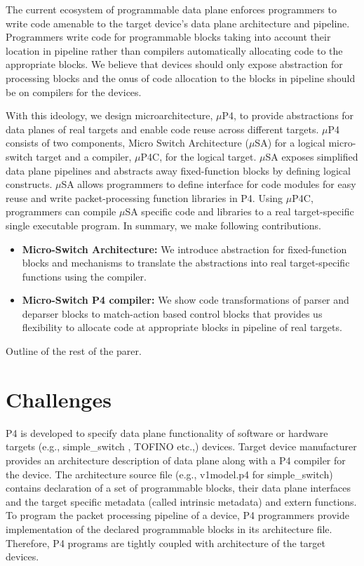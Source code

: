 \documentclass{hotnets19}
\begin{document}
The current ecosystem of programmable data plane enforces programmers to write code amenable to the target device's data plane architecture and pipeline.
Programmers write code for programmable blocks taking into account their location in pipeline rather than compilers automatically allocating code to the appropriate blocks.
We believe that devices should only expose abstraction for processing blocks and the onus of code allocation to the blocks in pipeline should be on compilers for the devices.

With this ideology, we design microarchitecture, $\mu$P4, to provide abstractions for 
data planes of real targets and enable code reuse across different targets.
$\mu$P4 consists of two components, Micro Switch Architecture ($\mu$SA) for a logical micro-switch target and a compiler, $\mu$P4C, for the logical target. 
$\mu$SA exposes simplified data plane pipelines and abstracts away fixed-function blocks by defining logical constructs.
$\mu$SA allows programmers to define interface for code modules for easy reuse and write packet-processing function libraries in P4.
Using $\mu$P4C, programmers can compile $\mu$SA specific code and libraries to a real target-specific single executable program.
In summary, we make following contributions.
\begin{itemize}
\item \textbf{Micro-Switch Architecture:} We introduce abstraction for fixed-function blocks and mechanisms to translate the abstractions into real target-specific functions using the compiler.
\item \textbf{Micro-Switch P4 compiler:} We show code transformations of parser and deparser blocks to match-action based control blocks that provides us flexibility to allocate code at appropriate blocks in pipeline of real targets.
\end{itemize}

Outline of the rest of the parer. 

\section{Challenges}
P4 is developed to specify data plane functionality of software or hardware targets (e.g., simple\_\-switch \cite{simple_switch.md}, TOFINO \cite{tofino} etc.,) devices.
Target device manufacturer provides an architecture description of data plane along with a P4 compiler for the device.
The architecture source file (e.g., v1\-mod\-el\-.p4 \cite{v1model.p4} for simple\_switch) contains declaration of a set of pro\-gram\-ma\-ble blocks, their data plane interfaces and the target specific metadata (called intrinsic metadata) and extern functions.
To program the packet processing pipeline of a device, P4 programmers provide implementation of the declared programmable blocks in its architecture file.
Therefore, P4 programs are tightly coupled with architecture of the target devices.
\end{document}
